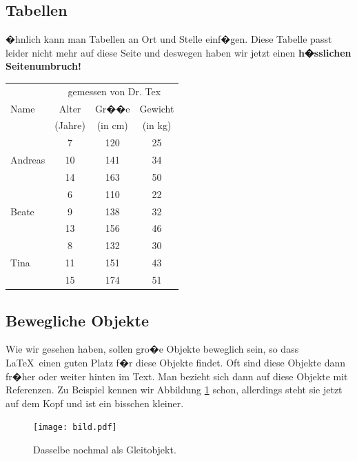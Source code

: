 \documentclass[11pt,a4paper]{article} %
\begin{document}
\subsection{Tabellen}
\label{Tabellen}

�hnlich kann man Tabellen an Ort und Stelle einf�gen. Diese Tabelle passt leider nicht mehr auf diese Seite und deswegen haben wir jetzt einen \textbf{h�sslichen Seitenumbruch!}

\begin{center}
\begin{tabular}{|l||c|c|c|}
\hline
           & \multicolumn{3}{|c|}{gemessen von Dr. Tex} \\
\cline{2-4}
Name       &  Alter    & Gr��e   & Gewicht \\
           &  (Jahre)  & (in cm) & (in kg) \\
\hline
\hline
           &   7       &  120    &  25     \\
\cline{2-4}
Andreas    &   10      &  141    &  34     \\
\cline{2-4}
           &   14      &  163    &  50     \\
\hline
           &   6       &  110    &  22     \\
\cline{2-4}
Beate      &   9       &  138    &  32     \\
\cline{2-4}
           &   13      &  156    &  46     \\
\hline
           &   8       &  132    &  30     \\
\cline{2-4}
Tina       &   11      &  151    &  43     \\
\cline{2-4}
           &   15      &  174    &  51     \\
\hline
\end{tabular}
\end{center}

\subsection{Bewegliche Objekte}
\label{Floats}

Wie wir gesehen haben, sollen gro�e Objekte beweglich sein, so dass \LaTeX\ einen guten Platz f�r diese Objekte findet. Oft sind diese Objekte dann fr�her oder weiter hinten im Text. Man bezieht sich dann auf diese Objekte mit Referenzen. Zu Beispiel kennen wir Abbildung \ref{bild} schon, allerdings steht sie jetzt auf dem Kopf und ist ein bisschen kleiner.

\begin{figure}[h]
\begin{center}
\texttt{[image: bild.pdf]}
\caption{Dasselbe nochmal als Gleitobjekt. \label{bild}}
\end{center}
\end{figure}

\end{document}
